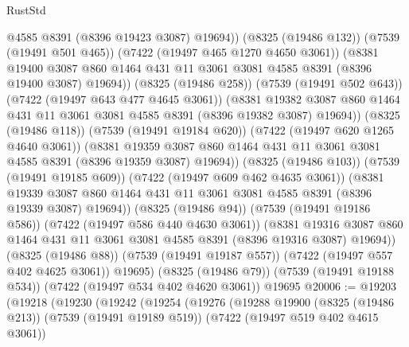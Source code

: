 \begin{lexlean}{RustStd}
\begin{coremodule}
                    @4585
                    @8391
                    (@8396 @19423 @3087)
                    @19694))
                (@8325 (@19486 @132))
                (@7539 (@19491 @501 @465))
                (@7422 (@19497 @465 @1270 @4650 @3061))
                (@8381
                  @19400
                  @3087
                  @860
                  @1464
                  @431
                  @11
                  @3061
                  @3081
                  @4585
                  @8391
                  (@8396 @19400 @3087)
                  @19694))
              (@8325 (@19486 @258))
              (@7539 (@19491 @502 @643))
              (@7422 (@19497 @643 @477 @4645 @3061))
              (@8381
                @19382
                @3087
                @860
                @1464
                @431
                @11
                @3061
                @3081
                @4585
                @8391
                (@8396 @19382 @3087)
                @19694))
            (@8325 (@19486 @118))
            (@7539 (@19491 @19184 @620))
            (@7422 (@19497 @620 @1265 @4640 @3061))
            (@8381
              @19359
              @3087
              @860
              @1464
              @431
              @11
              @3061
              @3081
              @4585
              @8391
              (@8396 @19359 @3087)
              @19694))
          (@8325 (@19486 @103))
          (@7539 (@19491 @19185 @609))
          (@7422 (@19497 @609 @462 @4635 @3061))
          (@8381
            @19339
            @3087
            @860
            @1464
            @431
            @11
            @3061
            @3081
            @4585
            @8391
            (@8396 @19339 @3087)
            @19694))
        (@8325 (@19486 @94))
        (@7539 (@19491 @19186 @586))
        (@7422 (@19497 @586 @440 @4630 @3061))
        (@8381
          @19316
          @3087
          @860
          @1464
          @431
          @11
          @3061
          @3081
          @4585
          @8391
          (@8396 @19316 @3087)
          @19694))
      (@8325 (@19486 @88))
      (@7539 (@19491 @19187 @557))
      (@7422 (@19497 @557 @402 @4625 @3061))
      @19695)
    (@8325 (@19486 @79))
    (@7539 (@19491 @19188 @534))
    (@7422 (@19497 @534 @402 @4620 @3061))
    @19695
@20006 := @19203
    (@19218
      (@19230
        (@19242
          (@19254
            (@19276
              (@19288
                @19900
                (@8325 (@19486 @213))
                (@7539 (@19491 @19189 @519))
                (@7422 (@19497 @519 @402 @4615 @3061))

\end{coremodule}
\end{lexlean}
